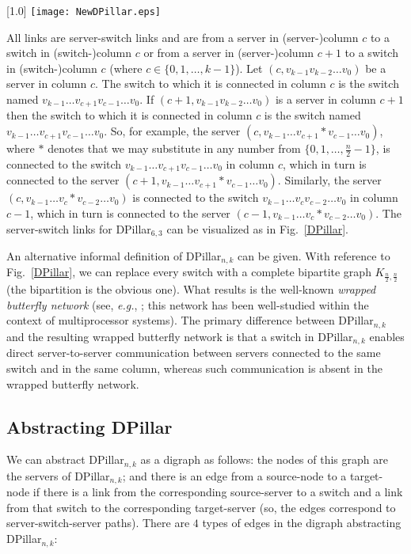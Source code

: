 \documentclass{article}
\newcounter{fig}
\begin{document}
\begin{figure*}[t]
\centering
\scalebox{1.0}[1.0]{
\texttt{[image: NewDPillar.eps]}}
\caption{Visualizing DPillar$_{6,3}$.}\label{DPillar}
\end{figure*}

All links are server-switch links and are from a server in (server-)column $c$ to a switch in (switch-)column $c$ or from a server in (server-)column $c+1$ to a switch in (switch-)column $c$ (where $c\in\{0,1,\ldots,k-1\}$). Let $(c,v_{k-1}v_{k-2}\ldots v_0)$ be a server in column $c$. The switch to which it is connected in column $c$ is the switch named $v_{k-1}\ldots v_{c+1}v_{c-1}\ldots v_0$. If $(c+1,v_{k-1}v_{k-2}\ldots v_0)$ is a server in column $c+1$ then the switch to which it is connected in column $c$ is the switch named $v_{k-1}\ldots v_{c+1}v_{c-1}\ldots v_0$. So, for example, the server $(c,v_{k-1}\ldots v_{c+1}*v_{c-1}\ldots v_0)$, where $*$ denotes that we may substitute in any number from $\{0,1,\ldots,\frac{n}{2}-1\}$, is connected to the switch $v_{k-1}\ldots v_{c+1}v_{c-1}\ldots v_0$ in column $c$, which in turn is connected to the server $(c+1,v_{k-1}\ldots v_{c+1}*v_{c-1}\ldots v_0)$. Similarly, the server $(c,v_{k-1}\ldots v_{c}*v_{c-2}\ldots v_0)$ is connected to the switch $v_{k-1}\ldots v_{c}v_{c-2}\ldots v_0$ in column $c-1$, which in turn is connected to the server $(c-1,v_{k-1}\ldots v_{c}*v_{c-2}\ldots v_0)$. The server-switch links for DPillar$_{6,3}$ can be visualized as in Fig.~\ref{DPillar}.

An alternative informal definition of DPillar$_{n,k}$ can be given. With reference to Fig.~\ref{DPillar}, we can replace every switch with a complete bipartite graph $K_{\frac{n}{2},\frac{n}{2}}$ (the bipartition is the obvious one). What results is the well-known \emph{wrapped butterfly network\/} (see, \emph{e.g.}, \cite{Lei92}; this network has been well-studied within the context of multiprocessor systems). The primary difference between DPillar$_{n,k}$ and the resulting wrapped butterfly network is that a switch in DPillar$_{n,k}$ enables direct server-to-server communication between servers connected to the same switch and in the same column, whereas such communication is absent in the wrapped butterfly network.

\subsection{Abstracting DPillar}\label{subsect:absDPillar}

We can abstract DPillar$_{n,k}$ as a digraph as follows: the nodes of this graph are the servers of DPillar$_{n,k}$; and there is an edge from a source-node to a target-node if there is a link from the corresponding source-server to a switch and a link from that switch to the corresponding target-server (so, the edges correspond to server-switch-server paths). There are $4$ types of edges in the digraph abstracting DPillar$_{n,k}$:
\end{document}

